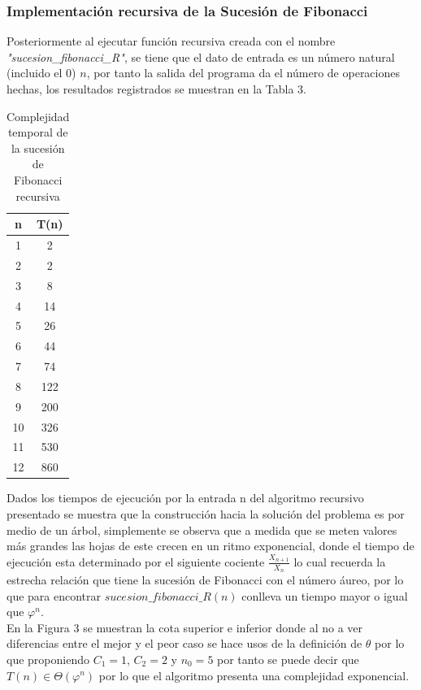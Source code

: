 \documentclass[12pt,twoside]{article}
\begin{document}
\subsubsection{Implementaci\'on recursiva de la Sucesión de Fibonacci}
Posteriormente al ejecutar funci\'on recursiva creada con el nombre \textit{"sucesion\_fibonacci\_R"}, se tiene que el dato de entrada es un n\'umero natural (incluido el 0) $n$,  por tanto la salida del programa da el n\'umero de operaciones hechas, los resultados registrados se muestran en la Tabla 3.
\begin{longtable}{||c|c||}
        \caption{Complejidad temporal de la sucesi\'on de Fibonacci recursiva}\\
            \hline
                \textbf{n}&\textbf{T(n)}\\
            \hline
                {1}&{2}\\
            \hline
                {2}&{2}\\
            \hline
                {3}&{8}\\
            \hline
                {4}&{14}\\
            \hline
                {5}&{26}\\
            \hline
                {6}&{44}\\
            \hline
                {7}&{74}\\
            \hline
                {8}&{122}\\
            \hline
                {9}&{200}\\
            \hline
                {10}&{326}\\
            \hline
                {11}&{530}\\
            \hline
                {12}&{860}\\
            \hline
    \end{longtable}
Dados los tiempos de ejecución por la entrada n del algoritmo recursivo presentado se muestra que la construcci\'on hacia la soluci\'on del problema es por medio de un \'arbol, simplemente se observa que a medida que se meten valores m\'as grandes las hojas de este crecen en un ritmo exponencial, donde el tiempo de ejecuci\'on esta determinado por el siguiente cociente $\frac{X_{n+1}}{X_{n}}$ lo cual recuerda la estrecha relaci\'on que tiene la sucesi\'on de Fibonacci con el n\'umero \'aureo, por lo que para encontrar $sucesion\_fibonacci\_R(n)$ conlleva un tiempo mayor o igual que $\varphi^{n}$.\\
En la Figura 3 se muestran la cota superior e inferior donde al no a ver diferencias entre el mejor y el peor caso se hace usos de la definici\'on de $\theta$ por lo que proponiendo $C_{1}=1$, $C_{2}=2$ y $n_{0}=5$ por tanto se puede decir que $T(n)\in \Theta(\varphi^{n})$ por lo que el algoritmo presenta una complejidad exponencial.
\end{document}
